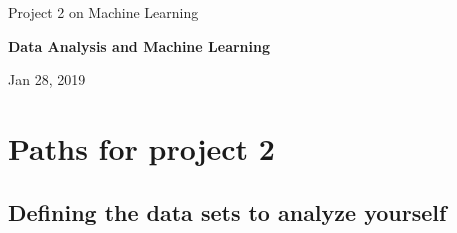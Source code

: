 \documentclass[%
oneside,                 %
final,                   %
10pt]{article}
\begin{document}

\newcommand{\exercisesection}[1]{\subsection*{#1}}






\thispagestyle{empty}

\begin{center}
{\LARGE\bf
\begin{spacing}{1.25}
Project 2 on Machine Learning
\end{spacing}
}
\end{center}


\begin{center}
{\bf Data Analysis and Machine Learning${}^{}$} \\ [0mm]
\end{center}

\begin{center}
\end{center}
    

\begin{center}
Jan 28, 2019
\end{center}

\vspace{1cm}


\section{Paths for project 2}

\subsection{Defining the data sets to analyze yourself}
\end{document}
